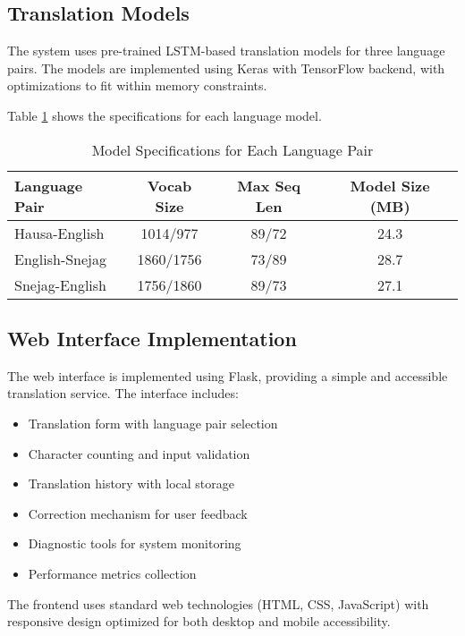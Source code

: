 \documentclass[conference]{IEEEtran}
\begin{document}
\subsection{Translation Models}

The system uses pre-trained LSTM-based translation models for three language pairs. The models are implemented using Keras with TensorFlow backend, with optimizations to fit within memory constraints.

Table \ref{tab:model-specs} shows the specifications for each language model.

\begin{table}[htbp]
\centering
\caption{Model Specifications for Each Language Pair}
\label{tab:model-specs}
\begin{tabular}{@{}lccc@{}}
\toprule
Language Pair & Vocab Size & Max Seq Len & Model Size (MB) \\
\midrule
Hausa-English & 1014/977 & 89/72 & 24.3 \\
English-Snejag & 1860/1756 & 73/89 & 28.7 \\
Snejag-English & 1756/1860 & 89/73 & 27.1 \\
\bottomrule
\end{tabular}
\end{table}

\subsection{Web Interface Implementation}

The web interface is implemented using Flask, providing a simple and accessible translation service. The interface includes:

\begin{itemize}
    \item Translation form with language pair selection
    \item Character counting and input validation
    \item Translation history with local storage
    \item Correction mechanism for user feedback
    \item Diagnostic tools for system monitoring
    \item Performance metrics collection
\end{itemize}

The frontend uses standard web technologies (HTML, CSS, JavaScript) with responsive design optimized for both desktop and mobile accessibility.
\end{document}
